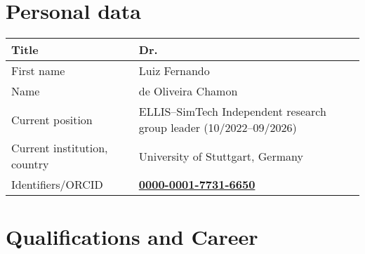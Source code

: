 \documentclass[a4paper,11pt]{article}
\begin{document}
\section*{Personal data}

\begin{tabularx}{\textwidth}{|>{\raggedright\arraybackslash}p{4.5cm}|L|}
\hline
Title
	& Dr. \\
\hline
First name
	& Luiz Fernando \\
\hline
Name
	& de Oliveira Chamon \\
\hline
Current position
	& ELLIS--SimTech Independent research group leader (10/2022--09/2026) \\
\hline
Current institution, country
	& University of Stuttgart, Germany \\
\hline
Identifiers/ORCID
	& \href{https://orcid.org/0000-0001-7731-6650}{\textbf{0000-0001-7731-6650}} \\
\hline
\end{tabularx}





\section*{Qualifications and Career}
\end{document}
